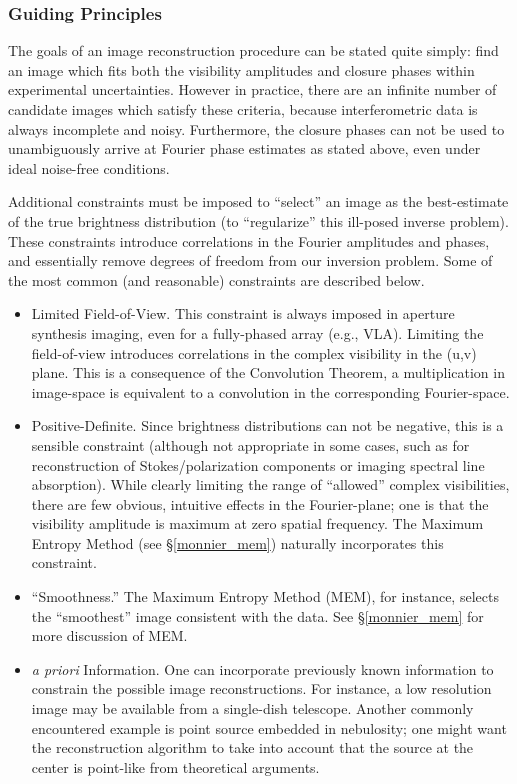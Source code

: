 \documentclass[12pt]{article}
\begin{document}
\subsubsection{Guiding Principles}
The goals of an image reconstruction procedure can be stated quite
simply: find an image which fits both the visibility amplitudes and
closure phases within experimental uncertainties.  However in
practice, there are an infinite number of candidate images which
satisfy these criteria, because interferometric data is always
incomplete and noisy.  Furthermore, the closure phases can not be used
to unambiguously arrive at Fourier phase estimates as stated above,
even under ideal noise-free conditions.

Additional constraints must be imposed to ``select'' an image as the
best-estimate of the true brightness distribution (to ``regularize''
this ill-posed inverse problem). These constraints introduce
correlations in the Fourier amplitudes and phases, and essentially
remove degrees of freedom from our inversion problem. Some of the most
common (and reasonable) constraints are described below.
\begin{itemize}
\item{Limited Field-of-View.  This constraint is always imposed in
    aperture synthesis imaging, even for a fully-phased array (e.g.,
    VLA).  Limiting the field-of-view introduces correlations in the
    complex visibility in the (u,v) plane.  This is a consequence of
    the Convolution Theorem, a multiplication in image-space
    is equivalent to a convolution in the corresponding
    Fourier-space.}
\item{Positive-Definite.  Since brightness distributions can not be
    negative, this is a sensible constraint (although not appropriate
    in some cases, such as for reconstruction of Stokes/polarization
    components or imaging spectral line absorption).  While clearly
    limiting the range of ``allowed'' complex visibilities, there are
    few obvious, intuitive effects in the Fourier-plane; one is that
    the visibility amplitude is maximum at zero spatial frequency.
    The Maximum Entropy Method (see \S\ref{monnier_mem}) naturally
    incorporates this constraint.}
\item{``Smoothness.''  The Maximum Entropy Method (MEM), for instance,
    selects the ``smoothest'' image consistent with the data. 
See \S\ref{monnier_mem} for more discussion of MEM. }
\item{{\em a priori} Information.  One can incorporate previously
    known information to constrain the possible image reconstructions.
    For instance, a low resolution image may be available from a
    single-dish telescope.  Another commonly encountered example is
    point source embedded in nebulosity; one might want the
    reconstruction algorithm to take into account that the source at
    the center is point-like from theoretical arguments. }
\end{itemize}
\end{document}
